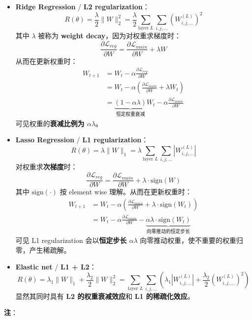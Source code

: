 \begin{itemize}
\tightlist
\item
  \textbf{Ridge Regression} / \textbf{L2 regularization}： \[
    R(\theta)
    = \frac{\lambda}{2}\|W\|_2^2
    = \frac{\lambda}{2}\sum_{\text{layer } L} \sum_{i,j,\dots} (W^{(L)}_{i,j,\dots})^2
    \] 其中 \(\lambda\) 被称为 \textbf{weight
  decay}，因为对权重求梯度时： \[
    \frac{\partial \mathcal{L}_{reg}}{\partial W} = \frac{\partial \mathcal{L}_{main}}{\partial W} + \lambda W
    \] 从而在更新权重时： \[
    \begin{aligned}
    W_{t+1}
    &= W_t - \alpha \frac{\partial \mathcal{L}_{reg}}{\partial W} \\
    &= W_t - \alpha \left( \frac{\partial \mathcal{L}_{main}}{\partial W} + \lambda W_t \right) \\
    &= \underbrace{(1 - \alpha \lambda)}_{\text{恒定权重衰减}} W_t - \alpha \frac{\partial \mathcal{L}_{main}}{\partial W}
    \end{aligned}
    \] 可见权重的\textbf{衰减比例为 \(\alpha \lambda\)}。
\item
  \textbf{Lasso Regression} / \textbf{L1 regularization}： \[
    R(\theta)
    = \lambda\|W\|_1
    = \lambda \sum_{\text{layer } L} \sum_{i,j,\dots} |W^{(L)}_{i,j,\dots}|
    \] 对权重求\textbf{次梯度}时： \[
    \frac{\partial \mathcal{L}_{reg}}{\partial W} = \frac{\partial \mathcal{L}_{main}}{\partial W} + \lambda \cdot \text{sign}(W)
    \] 其中 \(\text{sign}(\cdot)\) 按 element wise
  理解。从而在更新权重时： \[
    \begin{aligned}
    W_{t+1}
    &= W_t - \alpha \left( \frac{\partial \mathcal{L}_{main}}{\partial W} + \lambda \cdot \text{sign}(W_t) \right) \\[4pt]
    &= W_t - \alpha \frac{\partial \mathcal{L}_{main}}{\partial W} - \underbrace{\alpha\lambda \cdot \text{sign}(W_t)}_{\text{向零推动的恒定步长}}
    \end{aligned}
    \] 可见 L1 regularization 会以\textbf{恒定步长 \(\alpha\lambda\)}
  向零推动权重，使不重要的权重归零，产生稀疏解。
\item
  \textbf{Elastic net} / \textbf{L1 + L2}： \[
    R(\theta)
    = \lambda_1\|W\|_1 + \frac{\lambda_2}{2}\|W\|_2^2
    = \sum_{\text{layer } L} \sum_{i,j,\dots} \left( \lambda_1 |W^{(L)}_{i,j,\dots}|
    + \frac{\lambda_2}{2} (W^{(L)}_{i,j,\dots})^2 \right)
    \] 显然其同时具有 \textbf{L2 的权重衰减效应}和 \textbf{L1
  的稀疏化效应}。
\end{itemize}

\textbf{注}：

